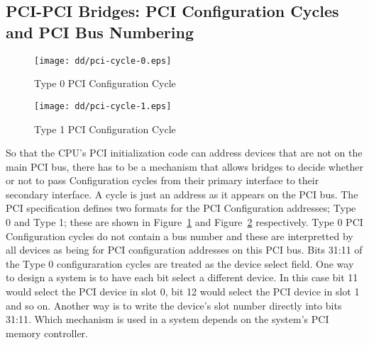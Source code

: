 \subsection{PCI-PCI Bridges: PCI Configuration Cycles and PCI Bus Numbering}
\begin{figure}
\begin{center}
{\centering \texttt{[image: dd/pci-cycle-0.eps]} \par}
\end{center}
\caption{Type 0 PCI Configuration Cycle}
\label{type-0-configuration-cycle}
\end{figure}
\begin{figure}
\begin{center}
{\centering \texttt{[image: dd/pci-cycle-1.eps]} \par}
\end{center}
\caption{Type 1 PCI Configuration Cycle}
\label{type-1-configuration-cycle}
\end{figure}
So that the CPU's PCI initialization code can address devices that 
are not on the main PCI bus, there has to be a mechanism 
that allows bridges to decide whether or not to pass 
Configuration cycles from their primary interface to 
their secondary interface.
A cycle is just an address as it appears on the PCI bus.   
The PCI specification defines two formats for the PCI Configuration addresses; Type 0 and Type 1; these
are shown in Figure~\ref{type-0-configuration-cycle} and Figure~\ref{type-1-configuration-cycle}
respectively.
Type 0 PCI Configuration cycles do not contain a bus number and these are
interpretted by all devices as being for PCI configuration addresses 
on this PCI bus.
Bits 31:11 of the Type 0 configuraration cycles are treated as the
device select field.
One way to design a system is to have each bit select a different device.
In this case bit 11 would select the PCI device in slot 0, bit 12 would
select the PCI device in slot 1 and so on.
Another way is to write the device's slot number directly into bits 31:11.
Which mechanism is used in a system depends on the system's PCI memory 
controller.

